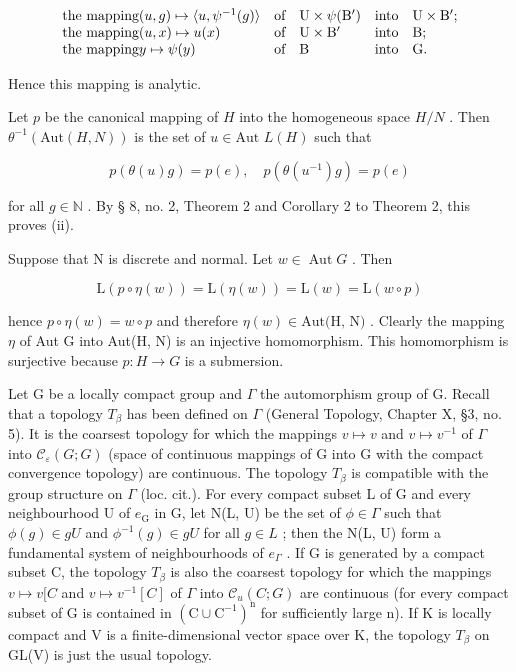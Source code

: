 \[
\begin{array}{l l l l} \text {the mapping} (u, g) \mapsto \langle u, \psi^ {- 1} (g) \rangle & \text {of} & \mathrm{U} \times \psi (\mathrm{B} ^ {\prime}) & \text {into} \quad \mathrm{U} \times \mathrm{B} ^ {\prime}; \\ \text {the mapping} (u, x) \mapsto u (x) & \text {of} & \mathrm{U} \times \mathrm{B} ^ {\prime} & \text {into} \quad \mathrm{B}; \\ \text {the mapping} y \mapsto \psi (y) & \text {of} & \mathrm{B} & \text {into} \quad \mathrm{G}. \end{array}
\]

Hence this mapping is analytic.

Let \(p\) be the canonical mapping of \(H\) into the homogeneous space \(H/N\) . Then \(\theta^{-1}(\text{Aut}(H, N))\) is the set of \(u \in \text{Aut } L(H)\) such that

\[
p (\theta (u) g) = p (e), \quad p (\theta (u ^ {- 1}) g) = p (e)
\]

for all \(g \in \mathbb{N}\) . By § 8, no. 2, Theorem 2 and Corollary 2 to Theorem 2, this proves (ii).

Suppose that N is discrete and normal. Let \(w \in \operatorname{Aut} G\) . Then

\[
\mathrm{L} (p \circ \eta (w)) = \mathrm{L} (\eta (w)) = \mathrm{L} (w) = \mathrm{L} (w \circ p)
\]

hence \(p \circ \eta(w) = w \circ p\) and therefore \(\eta(w) \in \text{Aut(H, N)}\) . Clearly the mapping \(\eta\) of Aut G into Aut(H, N) is an injective homomorphism. This homomorphism is surjective because \(p: H \to G\) is a submersion.

Let G be a locally compact group and \(\Gamma\) the automorphism group of G. Recall that a topology \(T_{\beta}\) has been defined on \(\Gamma\) (General Topology, Chapter X, §3, no. 5). It is the coarsest topology for which the mappings \(v \mapsto v\) and \(v \mapsto v^{-1}\) of \(\Gamma\) into \(\mathcal{C}_{\varepsilon}(G; G)\) (space of continuous mappings of G into G with the compact convergence topology) are continuous. The topology \(T_{\beta}\) is compatible with the group structure on \(\Gamma\) (loc. cit.). For every compact subset L of G and every neighbourhood U of \(e_{\mathrm{G}}\) in G, let N(L, U) be the set of \(\phi \in \Gamma\) such that \(\phi(g) \in gU\) and \(\phi^{-1}(g) \in gU\) for all \(g \in L\) ; then the N(L, U) form a fundamental system of neighbourhoods of \(e_{\Gamma}\) . If G is generated by a compact subset C, the topology \(T_{\beta}\) is also the coarsest topology for which the mappings \(v \mapsto v[C\) and \(v \mapsto v^{-1}[C]\) of \(\Gamma\) into \(\mathcal{C}_{u}(C; G)\) are continuous (for every compact subset of G is contained in \((\mathrm{C} \cup \mathrm{C}^{-1})^{\mathrm{n}}\) for sufficiently large n). If K is locally compact and V is a finite-dimensional vector space over K, the topology \(T_{\beta}\) on GL(V) is just the usual topology.


